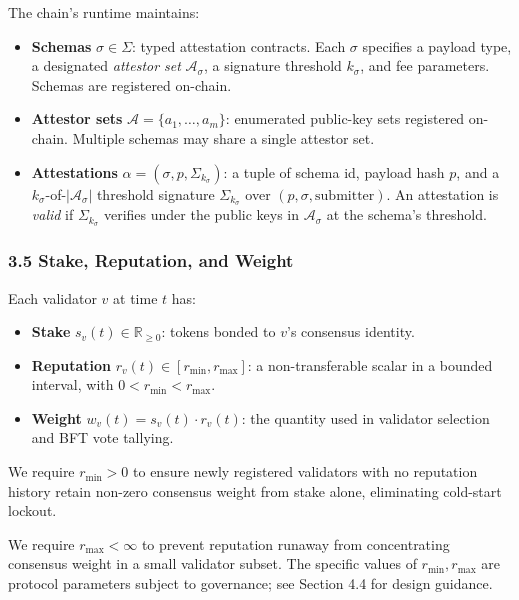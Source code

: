 \documentclass[
  11pt,
]{article}
\providecommand{\tightlist}{%
  \setlength{\itemsep}{0pt}\setlength{\parskip}{0pt}}
\begin{document}
The chain's runtime maintains:

\begin{itemize}
\tightlist
\item
  \textbf{Schemas} \(\sigma \in \Sigma\): typed attestation contracts.
  Each \(\sigma\) specifies a payload type, a designated \emph{attestor
  set} \(\mathcal{A}_\sigma\), a signature threshold \(k_\sigma\), and
  fee parameters. Schemas are registered on-chain.
\item
  \textbf{Attestor sets} \(\mathcal{A} = \{a_1, \ldots, a_m\}\):
  enumerated public-key sets registered on-chain. Multiple schemas may
  share a single attestor set.
\item
  \textbf{Attestations} \(\alpha = (\sigma, p, \Sigma_{k_\sigma})\): a
  tuple of schema id, payload hash \(p\), and a
  \(k_\sigma\)-of-\(|\mathcal{A}_\sigma|\) threshold signature
  \(\Sigma_{k_\sigma}\) over \((p, \sigma, \text{submitter})\). An
  attestation is \emph{valid} if \(\Sigma_{k_\sigma}\) verifies under
  the public keys in \(\mathcal{A}_\sigma\) at the schema's threshold.
\end{itemize}

\subsubsection{3.5 Stake, Reputation, and
Weight}\label{stake-reputation-and-weight}

Each validator \(v\) at time \(t\) has:

\begin{itemize}
\tightlist
\item
  \textbf{Stake} \(s_v(t) \in \mathbb{R}_{\geq 0}\): tokens bonded to
  \(v\)'s consensus identity.
\item
  \textbf{Reputation} \(r_v(t) \in [r_{\min}, r_{\max}]\): a
  non-transferable scalar in a bounded interval, with
  \(0 < r_{\min} < r_{\max}\).
\item
  \textbf{Weight} \(w_v(t) = s_v(t) \cdot r_v(t)\): the quantity used in
  validator selection and BFT vote tallying.
\end{itemize}

We require \(r_{\min} > 0\) to ensure newly registered validators with
no reputation history retain non-zero consensus weight from stake alone,
eliminating cold-start lockout.

We require \(r_{\max} < \infty\) to prevent reputation runaway from
concentrating consensus weight in a small validator subset. The specific
values of \(r_{\min}, r_{\max}\) are protocol parameters subject to
governance; see Section 4.4 for design guidance.
\end{document}
